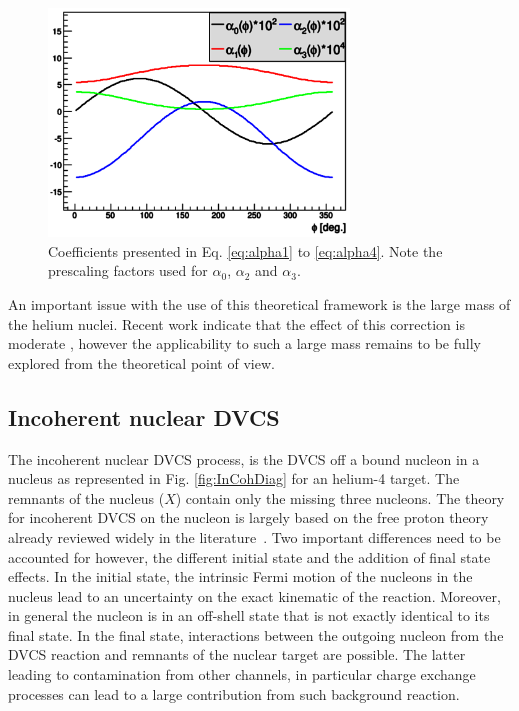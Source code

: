 \documentclass{article}
\begin{document}
\begin{figure}[tbp!]
\center
\includegraphics[width=8cm]{fig3/AlphaCoefs.png}
	\caption{Coefficients presented in Eq. \ref{eq:alpha1} to \ref{eq:alpha4}.
	Note the prescaling factors used for $\alpha_0$, $\alpha_2$ and $\alpha_3$.}
\label{fig:alphas}
\end{figure}

An important issue with the use of this theoretical framework is the large mass of the 
helium nuclei. Recent work indicate that the effect of this correction is moderate 
\cite{Braun:2012bg}, however the applicability to such a large mass remains to be
fully explored from the theoretical point of view.

\subsection{Incoherent nuclear DVCS}

The incoherent nuclear DVCS process, is the DVCS off a bound nucleon in a nucleus
as represented in Fig. \ref{fig:InCohDiag} for an helium-4 target. The remnants of 
the nucleus ($X$) contain only the missing three nucleons. 
The theory for incoherent DVCS on the nucleon is largely based on the free proton theory
already reviewed widely in the literature~\cite{Diehl:2003ny,Belitsky:2005qn,Guidal:2013rya}. 
Two important differences need to be accounted for however, the different initial state and the addition of 
final state effects. In the initial state, the intrinsic Fermi motion of the nucleons in the nucleus 
lead to an uncertainty on the exact kinematic of the reaction. Moreover, in general the nucleon 
is in an off-shell state that is not exactly identical to its final state. In the final state, 
interactions between the outgoing nucleon from the DVCS reaction and remnants of the nuclear 
target are possible. The latter leading to contamination from other channels, in particular 
charge exchange processes can lead to a large contribution from such background reaction. 
\end{document}
